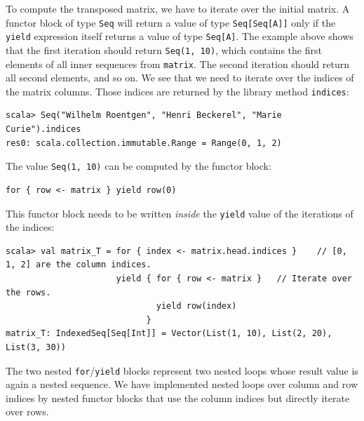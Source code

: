 To compute the transposed matrix, we have to iterate over the initial
matrix. A functor block of type \lstinline!Seq! will return a value
of type \lstinline!Seq[Seq[A]]! only if the \lstinline!yield! expression
itself returns a value of type \lstinline!Seq[A]!. The example above
shows that the first iteration should return \lstinline!Seq(1, 10)!,
which contains the first elements of all inner sequences from \lstinline!matrix!.
The second iteration should return all second elements, and so on.
We see that we need to iterate over the indices of the matrix columns.
Those indices are returned by the library method \lstinline!indices!:
\begin{lstlisting}
scala> Seq("Wilhelm Roentgen", "Henri Beckerel", "Marie Curie").indices
res0: scala.collection.immutable.Range = Range(0, 1, 2)
\end{lstlisting}
The value \lstinline!Seq(1, 10)! can be computed by the functor block:
\begin{lstlisting}
for { row <- matrix } yield row(0)
\end{lstlisting}
This functor block needs to be written \emph{inside} the \lstinline!yield!
value of the iterations of the indices:
\begin{lstlisting}
scala> val matrix_T = for { index <- matrix.head.indices }    // [0, 1, 2] are the column indices.
                      yield { for { row <- matrix }   // Iterate over the rows.
                              yield row(index)
                            }
matrix_T: IndexedSeq[Seq[Int]] = Vector(List(1, 10), List(2, 20), List(3, 30))
\end{lstlisting}

The two nested \lstinline!for!/\lstinline!yield! blocks represent
two nested loops whose result value is again a nested sequence. We
have implemented nested loops over column and row indices by nested
functor blocks that use the column indices but directly iterate over
rows.

